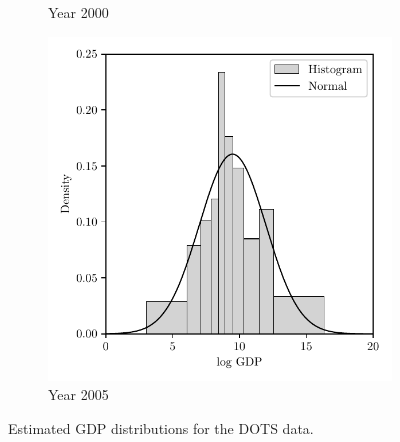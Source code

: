 \begin{figure}[ht]
\begin{subfigure}{0.32\textwidth}
    \caption{Year 2000}
  \end{subfigure}
  \begin{subfigure}{0.32\textwidth}
    \centering
    \includegraphics[scale=0.48]{graphics/trade_gdp_2005.pdf}
    \caption{Year 2005}
  \end{subfigure}
  \caption{Estimated GDP distributions for the DOTS data.}
  \label{fig:gdp}
\end{figure}

